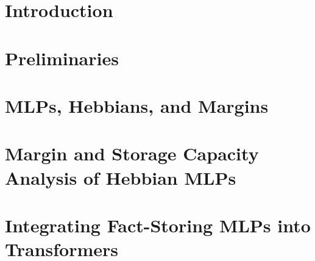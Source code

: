 \documentclass{article}
\begin{document}
\ifcolmsubmission
\linenumbers
\fi

\maketitle
\hebbianposttitlefootnotes

\begin{abstract}

\end{abstract}


\section{Introduction}
\label{sec:intro}


\section{Preliminaries}
\label{sec:definitions}


\section{MLPs, Hebbians, and Margins}
\label{sec:basic_setting}
\label{sec:3}


\section{Margin and Storage Capacity Analysis of Hebbian MLPs}
\label{sec:hebbian-kernel-mlps}
\label{sec:4}


\section{Integrating Fact-Storing MLPs into Transformers}
\label{sec:5}
\label{sec:usability}
\label{sec:transformers}




\newpage






\newpage

\appendix
\onecolumn

\end{document}
